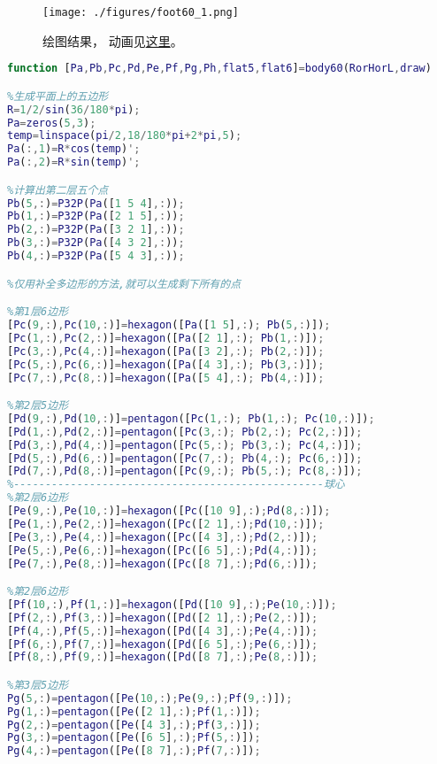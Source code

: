 
\begin{issues}
\issueDraft
\end{issues}


\begin{figure}[ht]
\centering
\texttt{[image: ./figures/foot60\_1.png]}
\caption{绘图结果， 动画见\href{https://wuli.wiki/apps/football.html}{这里}。} \label{foot60_fig1}
\end{figure}

\begin{lstlisting}[language=matlab, caption=body60.m]
function [Pa,Pb,Pc,Pd,Pe,Pf,Pg,Ph,flat5,flat6]=body60(RorHorL,draw)

%生成平面上的五边形
R=1/2/sin(36/180*pi);
Pa=zeros(5,3); 
temp=linspace(pi/2,18/180*pi+2*pi,5);
Pa(:,1)=R*cos(temp)';
Pa(:,2)=R*sin(temp)';

%计算出第二层五个点
Pb(5,:)=P32P(Pa([1 5 4],:));
Pb(1,:)=P32P(Pa([2 1 5],:));
Pb(2,:)=P32P(Pa([3 2 1],:));
Pb(3,:)=P32P(Pa([4 3 2],:));
Pb(4,:)=P32P(Pa([5 4 3],:));

%仅用补全多边形的方法,就可以生成剩下所有的点

%第1层6边形
[Pc(9,:),Pc(10,:)]=hexagon([Pa([1 5],:); Pb(5,:)]);
[Pc(1,:),Pc(2,:)]=hexagon([Pa([2 1],:); Pb(1,:)]);
[Pc(3,:),Pc(4,:)]=hexagon([Pa([3 2],:); Pb(2,:)]);
[Pc(5,:),Pc(6,:)]=hexagon([Pa([4 3],:); Pb(3,:)]);
[Pc(7,:),Pc(8,:)]=hexagon([Pa([5 4],:); Pb(4,:)]);

%第2层5边形
[Pd(9,:),Pd(10,:)]=pentagon([Pc(1,:); Pb(1,:); Pc(10,:)]);
[Pd(1,:),Pd(2,:)]=pentagon([Pc(3,:); Pb(2,:); Pc(2,:)]);
[Pd(3,:),Pd(4,:)]=pentagon([Pc(5,:); Pb(3,:); Pc(4,:)]);
[Pd(5,:),Pd(6,:)]=pentagon([Pc(7,:); Pb(4,:); Pc(6,:)]);
[Pd(7,:),Pd(8,:)]=pentagon([Pc(9,:); Pb(5,:); Pc(8,:)]);
%-------------------------------------------------球心
%第2层6边形
[Pe(9,:),Pe(10,:)]=hexagon([Pc([10 9],:);Pd(8,:)]);
[Pe(1,:),Pe(2,:)]=hexagon([Pc([2 1],:);Pd(10,:)]);
[Pe(3,:),Pe(4,:)]=hexagon([Pc([4 3],:);Pd(2,:)]);
[Pe(5,:),Pe(6,:)]=hexagon([Pc([6 5],:);Pd(4,:)]);
[Pe(7,:),Pe(8,:)]=hexagon([Pc([8 7],:);Pd(6,:)]);

%第2层6边形
[Pf(10,:),Pf(1,:)]=hexagon([Pd([10 9],:);Pe(10,:)]);
[Pf(2,:),Pf(3,:)]=hexagon([Pd([2 1],:);Pe(2,:)]);
[Pf(4,:),Pf(5,:)]=hexagon([Pd([4 3],:);Pe(4,:)]);
[Pf(6,:),Pf(7,:)]=hexagon([Pd([6 5],:);Pe(6,:)]);
[Pf(8,:),Pf(9,:)]=hexagon([Pd([8 7],:);Pe(8,:)]);

%第3层5边形
Pg(5,:)=pentagon([Pe(10,:);Pe(9,:);Pf(9,:)]);
Pg(1,:)=pentagon([Pe([2 1],:);Pf(1,:)]);
Pg(2,:)=pentagon([Pe([4 3],:);Pf(3,:)]);
Pg(3,:)=pentagon([Pe([6 5],:);Pf(5,:)]);
Pg(4,:)=pentagon([Pe([8 7],:);Pf(7,:)]);


\end{lstlisting}
